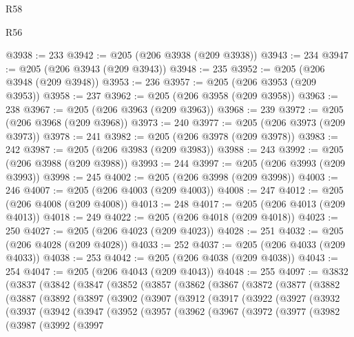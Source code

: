 \begin{lexlean}{R58}
\begin{lexlean}{R56}
\begin{coremodule}
{{{{{{{{{{{{{{{{{{{{{{{{{{{{{{{{{{{{{{{{{{{{{{{{{{{{{{{{{{{{{{{{{{{{{{{{{{{{{{{{{{{{{{{{{{{{{{{{{{{{{{{{{{{{{{{{{{{{{{{{{{{{{{{{{{{{{{{{{{{{{{{{{{{{{{{{{{{{{{{{{{{{{{{{{{{{{{{{{{{{{{{{{{{{{{{{{{{{{{{{{{{{{{{{{{{@3938 := 233
@3942 := @205 (@206 @3938 (@209 @3938))
@3943 := 234
@3947 := @205 (@206 @3943 (@209 @3943))
@3948 := 235
@3952 := @205 (@206 @3948 (@209 @3948))
@3953 := 236
@3957 := @205 (@206 @3953 (@209 @3953))
@3958 := 237
@3962 := @205 (@206 @3958 (@209 @3958))
@3963 := 238
@3967 := @205 (@206 @3963 (@209 @3963))
@3968 := 239
@3972 := @205 (@206 @3968 (@209 @3968))
@3973 := 240
@3977 := @205 (@206 @3973 (@209 @3973))
@3978 := 241
@3982 := @205 (@206 @3978 (@209 @3978))
@3983 := 242
@3987 := @205 (@206 @3983 (@209 @3983))
@3988 := 243
@3992 := @205 (@206 @3988 (@209 @3988))
@3993 := 244
@3997 := @205 (@206 @3993 (@209 @3993))
@3998 := 245
@4002 := @205 (@206 @3998 (@209 @3998))
@4003 := 246
@4007 := @205 (@206 @4003 (@209 @4003))
@4008 := 247
@4012 := @205 (@206 @4008 (@209 @4008))
@4013 := 248
@4017 := @205 (@206 @4013 (@209 @4013))
@4018 := 249
@4022 := @205 (@206 @4018 (@209 @4018))
@4023 := 250
@4027 := @205 (@206 @4023 (@209 @4023))
@4028 := 251
@4032 := @205 (@206 @4028 (@209 @4028))
@4033 := 252
@4037 := @205 (@206 @4033 (@209 @4033))
@4038 := 253
@4042 := @205 (@206 @4038 (@209 @4038))
@4043 := 254
@4047 := @205 (@206 @4043 (@209 @4043))
@4048 := 255
@4097 := @3832
    (@3837
      (@3842
        (@3847
          (@3852
            (@3857
              (@3862
                (@3867
                  (@3872
                    (@3877
                      (@3882
                        (@3887
                          (@3892
                            (@3897
                              (@3902
                                (@3907
                                  (@3912
                                    (@3917
                                      (@3922
                                        (@3927
                                          (@3932
                                            (@3937
                                              (@3942
                                                (@3947
                                                  (@3952
                                                    (@3957
                                                      (@3962
                                                        (@3967
                                                          (@3972
                                                            (@3977
                                                              (@3982
                                                                (@3987
                                                                  (@3992
                                                                    (@3997
}}}}}}}}}}}}}}}}}}}}}}}}}}}}}}}}}}}}}}}}}}}}}}}}}}}}}}}}}}}}}}}}}}}}}}}}}}}}}}}}}}}}}}}}}}}}}}}}}}}}}}}}}}}}}}}}}}}}}}}}}}}}}}}}}}}}}}}}}}}}}}}}}}}}}}}}}}}}}}}}}}}}}}}}}}}}}}}}}}}}}}}}}}}}}}}}}}}}}}}}}}}}}}}}}}}
\end{coremodule}
\end{lexlean}
\end{lexlean}
